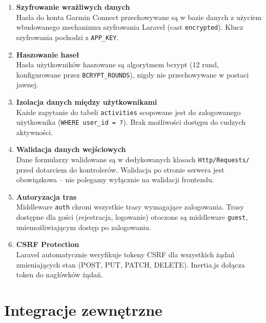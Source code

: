 \documentclass[12pt,a4paper]{report}
\begin{document}
\begin{enumerate}[resume]

\item \textbf{Szyfrowanie wrażliwych danych} \\
Hasła do konta Garmin Connect przechowywane są w bazie danych z użyciem wbudowanego mechanizmu szyfrowania Laravel (cast \texttt{encrypted}). Klucz szyfrowania pochodzi z \texttt{APP\_KEY}.

\item \textbf{Haszowanie haseł} \\
Hasła użytkowników haszowane są algorytmem bcrypt (12 rund, konfigurowane przez \texttt{BCRYPT\_ROUNDS}), nigdy nie przechowywane w postaci jawnej.

\item \textbf{Izolacja danych między użytkownikami} \\
Każde zapytanie do tabeli \texttt{activities} scopowane jest do zalogowanego użytkownika (\texttt{WHERE user\_id = ?}). Brak możliwości dostępu do cudzych aktywności.

\item \textbf{Walidacja danych wejściowych} \\
Dane formularzy walidowane są w dedykowanych klasach \texttt{Http/Requests/} przed dotarciem do kontrolerów. Walidacja po stronie serwera jest obowiązkowa -- nie polegamy wyłącznie na walidacji frontendu.

\item \textbf{Autoryzacja tras} \\
Middleware \texttt{auth} chroni wszystkie trasy wymagające zalogowania. Trasy dostępne dla gości (rejestracja, logowanie) otoczone są middleware \texttt{guest}, uniemożliwiającym dostęp po zalogowaniu.

\item \textbf{CSRF Protection} \\
Laravel automatycznie weryfikuje tokeny CSRF dla wszystkich żądań zmieniających stan (POST, PUT, PATCH, DELETE). Inertia.js dołącza token do nagłówków żądań.

\end{enumerate}

\section{Integracje zewnętrzne}
\end{document}
